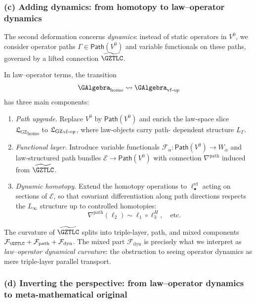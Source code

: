 \documentclass[11pt]{book}
\theoremstyle{plain}
\theoremstyle{definition}
\newcommand{\GZLS}{\ensuremath{\mathfrak{L}_{\mathrm{GZ}}}}       \newcommand{\GZLT}{\ensuremath{M_{!w}}}                           \newcommand{\GZLOC}{\ensuremath{A_M}}                             \newcommand{\GZLCurv}{\ensuremath{\mathcal{F}_{\mathrm{law}}}}
\begin{document}
\subsubsection*{(c) Adding dynamics: from homotopy \texorpdfstring{\GAlgebra}{G-Algebra} to law--operator dynamics}

The second deformation concerns \emph{dynamics}: instead of static
operators in $V^0$, we consider operator paths $\Gamma\in\mathsf{Path}(V^0)$
and variable functionals on these paths, governed by a lifted
connection $\widetilde{\GZTLC}$.

In law--operator terms, the transition
\[
   \GAlgebra_{\mathrm{homo}}
   \leadsto
   \GAlgebra_{\mathrm{vf\text- op}}
\]
has three main components:

\begin{enumerate}[label=\roman*)]
  \item \emph{Path upgrade.}
        Replace $V^0$ by $\mathsf{Path}(V^0)$ and enrich the law-space
        slice ${\GZLS}_{\mathrm{homo}}$ to
        ${\GZLS}_{\mathrm{vf\text- op}}$, where law-objects carry path-
        dependent structure $L_\Gamma$.
  \item \emph{Functional layer.}
        Introduce variable functionals
        $\mathcal{F}_\alpha:\mathsf{Path}(V^0)\to W_\alpha$ and
        law-structured path bundles
        $\mathcal{E}\to\mathsf{Path}(V^0)$ with connection
        $\nabla^{\mathrm{path}}$ induced from $\widetilde{\GZTLC}$.
  \item \emph{Dynamic homotopy.}
        Extend the homotopy operations to
        $\ell_\bullet^{\mathrm{vf}}$ acting on sections of
        $\mathcal{E}$, so that covariant differentiation along path
        directions respects the $L_\infty$ structure up to controlled
        homotopies:
        \[
          \nabla^{\mathrm{path}}(\ell_2)
          \sim
          \ell_1\circ\ell_3^H,
          \quad\text{etc.}
        \]
\end{enumerate}

The curvature of $\widetilde{\GZTLC}$ splits into triple-layer,
path, and mixed components
$\mathcal{F}_{\GZTLC}+\mathcal{F}_{\mathrm{path}}
 +\mathcal{F}_{\mathrm{dyn}}$.
The mixed part $\mathcal{F}_{\mathrm{dyn}}$ is precisely what we
interpret as \emph{law--operator dynamical curvature}: the obstruction
to seeing operator dynamics as mere triple-layer parallel transport.



\subsubsection*{(d) Inverting the perspective: from law--operator dynamics to meta-mathematical original}
\end{document}
